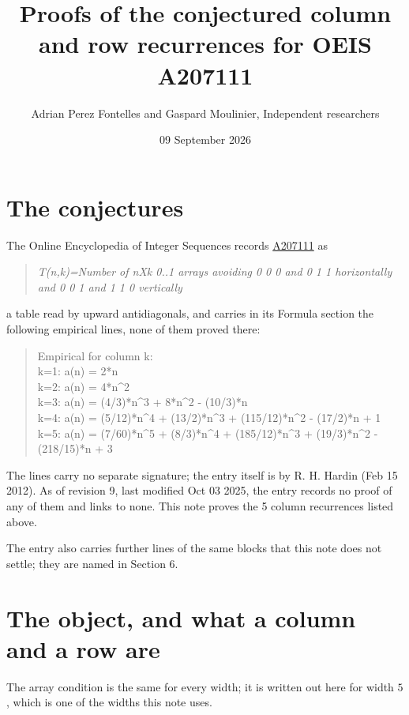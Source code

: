 \documentclass[11pt]{article}
\title{Proofs of the conjectured column and row recurrences for OEIS A207111}
\author{Adrian Perez Fontelles and Gaspard Moulinier, Independent researchers}
\date{09 September 2026}
\theoremstyle{definition}
\begin{document}
\maketitle
\section{The conjectures}

The Online Encyclopedia of Integer Sequences records \href{https://oeis.org/A207111}{A207111} as

\begin{quote}\itshape T(n,k)=Number of nXk 0..1 arrays avoiding 0 0 0 and 0 1 1 horizontally and 0 0 1 and 1 1 0 vertically\end{quote}

a table read by upward antidiagonals, and carries in its Formula section the following empirical lines, none of them proved there:

\begin{quote}\ttfamily Empirical for column k:\\
k=1: a(n) = 2*n\\k=2: a(n) = 4*n\textasciicircum{}2\\k=3: a(n) = (4/3)*n\textasciicircum{}3 + 8*n\textasciicircum{}2 - (10/3)*n\\k=4: a(n) = (5/12)*n\textasciicircum{}4 + (13/2)*n\textasciicircum{}3 + (115/12)*n\textasciicircum{}2 - (17/2)*n + 1\\k=5: a(n) = (7/60)*n\textasciicircum{}5 + (8/3)*n\textasciicircum{}4 + (185/12)*n\textasciicircum{}3 + (19/3)*n\textasciicircum{}2 - (218/15)*n + 3\end{quote}

The lines carry no separate signature; the entry itself is by R. H. Hardin (Feb 15 2012). As of revision 9, last modified Oct 03 2025, the entry records no proof of any of them and links to none. This note proves the 5 column recurrences listed above.

The entry also carries further lines of the same blocks that this note does not settle; they are named in Section 6.

\section{The object, and what a column and a row are}

The array condition is the same for every width; it is written out here for width $5$, which is one of the widths this note uses.
\end{document}
